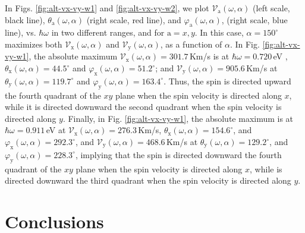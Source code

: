 \documentclass[floatfix,prb,aps,superscriptaddress,showpacs,11pt,preprint,letterpaper]{revtex4}
\begin{document}
In Figs. \ref{fig:alt-vx-vy-w1} and \ref{fig:alt-vx-vy-w2}, we plot
$\mathcal{V}_{\mathrm{a}} (\omega,\alpha)$ (left scale, black line),
$\theta_{\mathrm{a}} (\omega,\alpha)$ (right scale, red line), and
$\varphi_{\mathrm{a}} (\omega,\alpha)$, (right scale, blue line), vs.
$\hbar\omega$ in two different ranges, and  for $\mathrm{a}=x,y$. In this case,
$\alpha=150^\circ$  maximizes both $\mathcal{V}_{\mathrm{x}} (\omega,\alpha)$
and $\mathcal{V}_{\mathrm{y}} (\omega,\alpha)$, as a function of $\alpha$. In
Fig. \ref{fig:alt-vx-vy-w1}, the absolute maximum $\mathcal{V}_{\mathrm{x}}
(\omega,\alpha) = 301.7$\,Km/s is at $\hbar\omega=0.720$\,eV ,
$\theta_{\mathrm{x}} (\omega,\alpha) = 44.5^{\circ}$ and
$\varphi_{\mathrm{x}}(\omega,\alpha) = 51.2^{\circ}$; and
$\mathcal{V}_{\mathrm{y}} (\omega,\alpha) = 905.6$\,Km/s at
$\theta_{\mathrm{y}} (\omega,\alpha) = 119.7^{\circ}$ and
$\varphi_{\mathrm{y}}(\omega,\alpha) = 163.4^{\circ}$. Thus, the spin is
directed upward the fourth quadrant of the $xy$ plane when the spin
velocity is directed along $x$, while it is directed downward the second
quadrant when the spin velocity is directed along $y$. Finally, in
Fig. \ref{fig:alt-vx-vy-w1}, the absolute maximum is at $\hbar\omega=0.911$\,eV
at $\mathcal{V}_{\mathrm{x}} (\omega,\alpha) = 276.3$\,Km/s,
$\theta_{\mathrm{x}} (\omega,\alpha) = 154.6^{\circ}$, and
$\varphi_{\mathrm{x}}(\omega,\alpha) = 292.3^{\circ}$, and
$\mathcal{V}_{\mathrm{y}} (\omega,\alpha) = 468.6$\,Km/s at
$\theta_{\mathrm{y}} (\omega,\alpha) = 129.2^{\circ}$, and
$\varphi_{\mathrm{y}}(\omega,\alpha) = 228.3^{\circ}$, implying that the spin
is directed downward the fourth quadrant of the $xy$ plane when the
spin velocity is directed along $x$, while is directed downward the third
quadrant when the spin velocity is directed along $y$.

\section{Conclusions}
\label{sec:conclusions}
\end{document}
